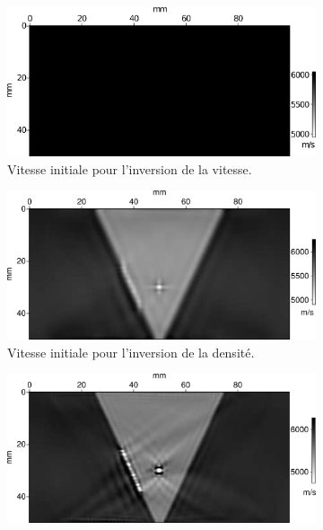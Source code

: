 \begin{figure}[!h]
	\centering
	\begin{subfigure}[b]{0.45\textwidth}
		\includegraphics[width=\textwidth]{img/mono_param/vp_uni.png}
		\caption{Vitesse initiale pour l'inversion de la vitesse.}
	\end{subfigure}
	\begin{subfigure}[b]{0.45\textwidth}
		\includegraphics[width=\textwidth]{img/mono_param/vp_smooth.png}
		\caption{Vitesse initiale pour l'inversion de la densité. }
	\end{subfigure}
	\begin{subfigure}[b]{0.45\textwidth}
		\includegraphics[width=\textwidth]{img/mono_param/vp_mono.png}

\end{subfigure}
\end{figure}
